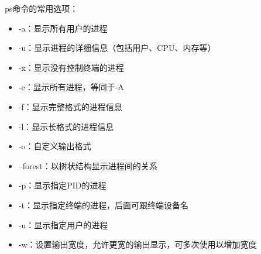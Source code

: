 \documentclass[12pt,UTF8]{ctexbook}
\begin{document}
ps命令的常用选项：
\begin{itemize}
    \item -a：显示所有用户的进程
    \item -u：显示进程的详细信息（包括用户、CPU、内存等）
    \item -x：显示没有控制终端的进程
    \item -e：显示所有进程，等同于-A
    \item -f：显示完整格式的进程信息
    \item -l：显示长格式的进程信息
    \item -o：自定义输出格式
    \item --forest：以树状结构显示进程间的关系
    \item -p：显示指定PID的进程
    \item -t：显示指定终端的进程，后面可跟终端设备名
    \item -u：显示指定用户的进程
    \item -w：设置输出宽度，允许更宽的输出显示，可多次使用以增加宽度
\end{itemize}
\end{document}
